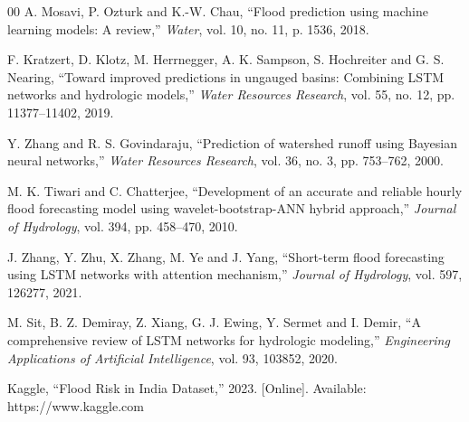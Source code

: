 \documentclass[conference]{IEEEtran}
\begin{document}
\begin{thebibliography}{00}
A. Mosavi, P. Ozturk and K.-W. Chau, “Flood prediction using machine learning models: A review,” \textit{Water}, vol. 10, no. 11, p. 1536, 2018.

F. Kratzert, D. Klotz, M. Herrnegger, A. K. Sampson, S. Hochreiter and G. S. Nearing, 
“Toward improved predictions in ungauged basins: Combining LSTM networks and hydrologic models,” 
\textit{Water Resources Research}, vol. 55, no. 12, pp. 11377–11402, 2019.

Y. Zhang and R. S. Govindaraju, 
“Prediction of watershed runoff using Bayesian neural networks,” 
\textit{Water Resources Research}, vol. 36, no. 3, pp. 753–762, 2000.

M. K. Tiwari and C. Chatterjee, 
“Development of an accurate and reliable hourly flood forecasting model using wavelet-bootstrap-ANN hybrid approach,” 
\textit{Journal of Hydrology}, vol. 394, pp. 458–470, 2010.

J. Zhang, Y. Zhu, X. Zhang, M. Ye and J. Yang, 
“Short-term flood forecasting using LSTM networks with attention mechanism,” 
\textit{Journal of Hydrology}, vol. 597, 126277, 2021.

M. Sit, B. Z. Demiray, Z. Xiang, G. J. Ewing, Y. Sermet and I. Demir, 
“A comprehensive review of LSTM networks for hydrologic modeling,” 
\textit{Engineering Applications of Artificial Intelligence}, vol. 93, 103852, 2020.

Kaggle, “Flood Risk in India Dataset,” 2023. [Online]. Available: https://www.kaggle.com  
\end{thebibliography}
\end{document}

